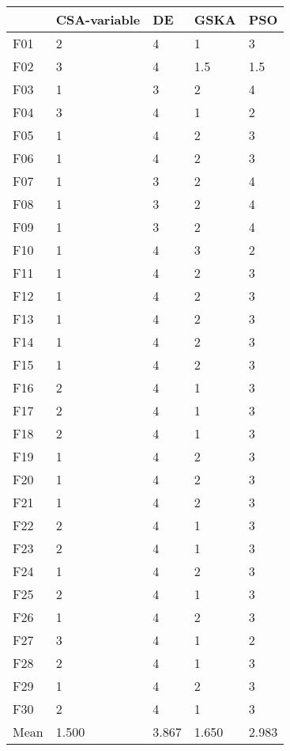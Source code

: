 \begin{tabular}{lllll}
\toprule
{} & CSA-variable &     DE &   GSKA &    PSO \\
\midrule
F01  &            2 &      4 &      1 &      3 \\
F02  &            3 &      4 &    1.5 &    1.5 \\
F03  &            1 &      3 &      2 &      4 \\
F04  &            3 &      4 &      1 &      2 \\
F05  &            1 &      4 &      2 &      3 \\
F06  &            1 &      4 &      2 &      3 \\
F07  &            1 &      3 &      2 &      4 \\
F08  &            1 &      3 &      2 &      4 \\
F09  &            1 &      3 &      2 &      4 \\
F10  &            1 &      4 &      3 &      2 \\
F11  &            1 &      4 &      2 &      3 \\
F12  &            1 &      4 &      2 &      3 \\
F13  &            1 &      4 &      2 &      3 \\
F14  &            1 &      4 &      2 &      3 \\
F15  &            1 &      4 &      2 &      3 \\
F16  &            2 &      4 &      1 &      3 \\
F17  &            2 &      4 &      1 &      3 \\
F18  &            2 &      4 &      1 &      3 \\
F19  &            1 &      4 &      2 &      3 \\
F20  &            1 &      4 &      2 &      3 \\
F21  &            1 &      4 &      2 &      3 \\
F22  &            2 &      4 &      1 &      3 \\
F23  &            2 &      4 &      1 &      3 \\
F24  &            1 &      4 &      2 &      3 \\
F25  &            2 &      4 &      1 &      3 \\
F26  &            1 &      4 &      2 &      3 \\
F27  &            3 &      4 &      1 &      2 \\
F28  &            2 &      4 &      1 &      3 \\
F29  &            1 &      4 &      2 &      3 \\
F30  &            2 &      4 &      1 &      3 \\
Mean &        1.500 &  3.867 &  1.650 &  2.983 \\
\bottomrule
\end{tabular}
